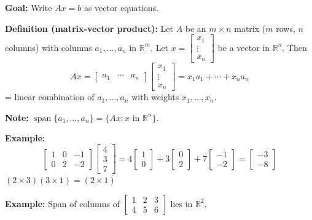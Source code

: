 \documentclass{article}
\begin{document}
\newpage

\textbf{Goal:} Write $Ax = b$ as vector equations.

\medskip

\textbf{Definition (matrix-vector product):} Let $A$ be an $m \times n$ matrix ($m$ rows, $n$ columns) with columns $a_1, \ldots, a_n$ in $\mathbb{R}^m$. Let $x = \begin{bmatrix} x_1 \\ \vdots \\ x_n \end{bmatrix}$ be a vector in $\mathbb{R}^n$. Then
\[
Ax = \begin{bmatrix} a_1 & \cdots & a_n \end{bmatrix} \begin{bmatrix} x_1 \\ \vdots \\ x_n \end{bmatrix} = x_1 a_1 + \cdots + x_n a_n
\]
= linear combination of $a_1, \ldots, a_n$ with weights $x_1, \ldots, x_n$.

\medskip

\textbf{Note:} $\operatorname{span}\{a_1, \ldots, a_n\} = \{Ax : x \text{ in } \mathbb{R}^n\}$.

\medskip

\textbf{Example:}
\[
\begin{bmatrix} 1 & 0 & -1 \\ 0 & 2 & -2 \end{bmatrix}
\begin{bmatrix} 4 \\ 3 \\ 7 \end{bmatrix}
= 4 \begin{bmatrix} 1 \\ 0 \end{bmatrix} + 3 \begin{bmatrix} 0 \\ 2 \end{bmatrix} + 7 \begin{bmatrix} -1 \\ -2 \end{bmatrix}
= \begin{bmatrix} -3 \\ -8 \end{bmatrix}
\]
$(2 \times 3)(3 \times 1) = (2 \times 1)$

\medskip

\textbf{Example:} Span of columns of $\begin{bmatrix} 1 & 2 & 3 \\ 4 & 5 & 6 \end{bmatrix}$ lies in $\mathbb{R}^2$.
\end{document}
